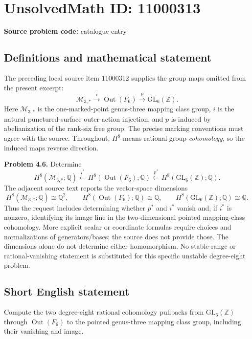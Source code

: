 \documentclass[11pt]{article}
\newcommand{\Z}{\mathbb{Z}}
\newcommand{\Q}{\mathbb{Q}}
\begin{document}
\section*{UnsolvedMath ID: 11000313}
\textbf{Source problem code:} catalogue entry
\subsection{Definitions and mathematical statement}
The preceding local source item 11000312 supplies the group maps omitted from the present excerpt:
\[
 \mathcal M_{3,*}\xrightarrow{i}\operatorname{Out}(F_6)
 \xrightarrow{p}\mathrm{GL}_6(\Z).
\]
Here $\mathcal M_{3,*}$ is the one-marked-point genus-three mapping class group, $i$ is the natural punctured-surface outer-action injection, and $p$ is induced by abelianization of the rank-six free group. The precise marking conventions must agree with the source. Throughout, $H^8$ means rational group \emph{cohomology}, so the induced maps reverse direction.

\textbf{Problem 4.6.} Determine
\[
 H^8(\mathcal M_{3,*};\Q)
 \xleftarrow{i^*}H^8(\operatorname{Out}(F_6);\Q)
 \xleftarrow{p^*}H^8(\mathrm{GL}_6(\Z);\Q).
\]
The adjacent source text reports the vector-space dimensions
\[
 H^8(\mathcal M_{3,*};\Q)\cong\Q^2,\qquad
 H^8(\operatorname{Out}(F_6);\Q)\cong\Q,\qquad
 H^8(\mathrm{GL}_6(\Z);\Q)\cong\Q.
\]
Thus the request includes determining whether $p^*$ and $i^*$ vanish and, if $i^*$ is nonzero, identifying its image line in the two-dimensional pointed mapping-class cohomology. More explicit scalar or coordinate formulas require choices and normalizations of generators/bases; the source does not provide those. The dimensions alone do not determine either homomorphism. No stable-range or rational-vanishing statement is substituted for this specific unstable degree-eight problem.
\subsection{Short English statement}
Compute the two degree-eight rational cohomology pullbacks from $\mathrm{GL}_6(\Z)$ through $\operatorname{Out}(F_6)$ to the pointed genus-three mapping class group, including their vanishing and image.
\end{document}

